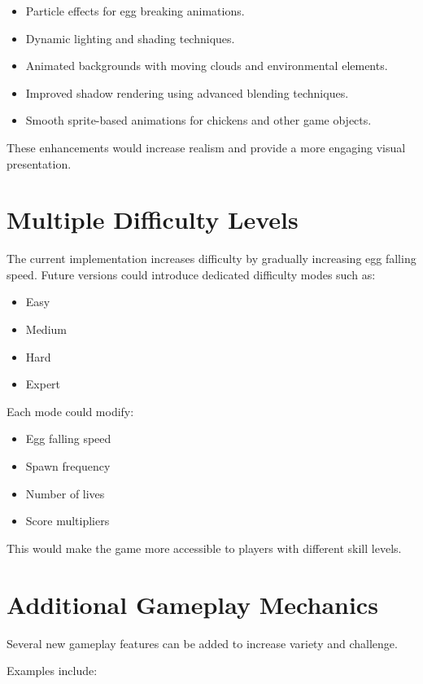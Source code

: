 \documentclass[12pt,a4paper]{report}
\begin{document}
\begin{itemize}
    \item Particle effects for egg breaking animations.
    \item Dynamic lighting and shading techniques.
    \item Animated backgrounds with moving clouds and environmental elements.
    \item Improved shadow rendering using advanced blending techniques.
    \item Smooth sprite-based animations for chickens and other game objects.
\end{itemize}

These enhancements would increase realism and provide a more engaging visual presentation.

\section{Multiple Difficulty Levels}

The current implementation increases difficulty by gradually increasing egg falling speed. Future versions could introduce dedicated difficulty modes such as:

\begin{itemize}
    \item Easy
    \item Medium
    \item Hard
    \item Expert
\end{itemize}

Each mode could modify:

\begin{itemize}
    \item Egg falling speed
    \item Spawn frequency
    \item Number of lives
    \item Score multipliers
\end{itemize}

This would make the game more accessible to players with different skill levels.

\section{Additional Gameplay Mechanics}

Several new gameplay features can be added to increase variety and challenge.

Examples include:
\end{document}
